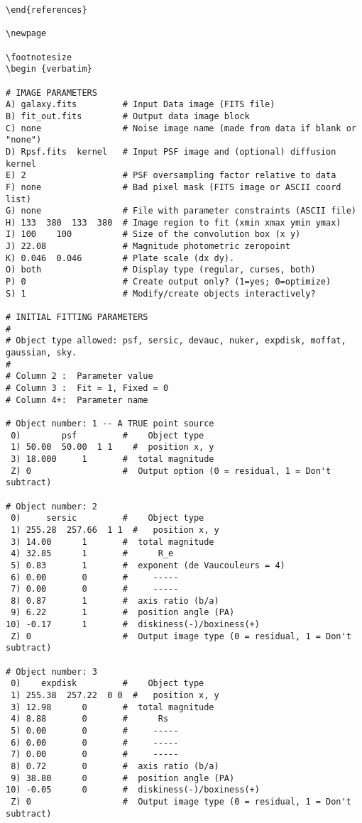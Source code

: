\documentclass[preprint]{aastex}
\begin{document}
\begin {verbatim}
\end{references}

\newpage

\footnotesize
\begin {verbatim}

# IMAGE PARAMETERS
A) galaxy.fits         # Input Data image (FITS file)
B) fit_out.fits        # Output data image block
C) none                # Noise image name (made from data if blank or "none") 
D) Rpsf.fits  kernel   # Input PSF image and (optional) diffusion kernel 
E) 2                   # PSF oversampling factor relative to data 
F) none                # Bad pixel mask (FITS image or ASCII coord list)
G) none                # File with parameter constraints (ASCII file) 
H) 133  380  133  380  # Image region to fit (xmin xmax ymin ymax)
I) 100    100          # Size of the convolution box (x y)
J) 22.08               # Magnitude photometric zeropoint 
K) 0.046  0.046        # Plate scale (dx dy). 
O) both                # Display type (regular, curses, both)
P) 0                   # Create output only? (1=yes; 0=optimize) 
S) 1                   # Modify/create objects interactively?

# INITIAL FITTING PARAMETERS
#
# Object type allowed: psf, sersic, devauc, nuker, expdisk, moffat, gaussian, sky.
#
# Column 2 :  Parameter value
# Column 3 :  Fit = 1, Fixed = 0
# Column 4+:  Parameter name

# Object number: 1 -- A TRUE point source
 0)        psf         #    Object type 
 1) 50.00  50.00  1 1    #  position x, y
 3) 18.000     1       #  total magnitude
 Z) 0                  #  Output option (0 = residual, 1 = Don't subtract) 

# Object number: 2
 0)     sersic         #    Object type
 1) 255.28  257.66  1 1  #   position x, y
 3) 14.00      1       #  total magnitude 
 4) 32.85      1       #      R_e
 5) 0.83       1       #  exponent (de Vaucouleurs = 4) 
 6) 0.00       0       #     ----- 
 7) 0.00       0       #     ----- 
 8) 0.87       1       #  axis ratio (b/a)  
 9) 6.22       1       #  position angle (PA) 
10) -0.17      1       #  diskiness(-)/boxiness(+)
 Z) 0                  #  Output image type (0 = residual, 1 = Don't subtract) 

# Object number: 3
 0)    expdisk         #    Object type
 1) 255.38  257.22  0 0  #   position x, y
 3) 12.98      0       #  total magnitude 
 4) 8.88       0       #      Rs 
 5) 0.00       0       #     ----- 
 6) 0.00       0       #     ----- 
 7) 0.00       0       #     ----- 
 8) 0.72       0       #  axis ratio (b/a)  
 9) 38.80      0       #  position angle (PA) 
10) -0.05      0       #  diskiness(-)/boxiness(+)
 Z) 0                  #  Output image type (0 = residual, 1 = Don't subtract) 


\end{verbatim}
\end{document}
